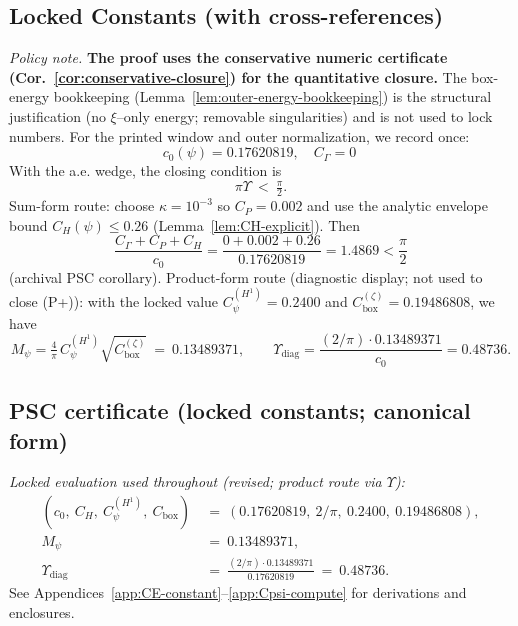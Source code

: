 \documentclass[11pt]{article}
\providecommand{\czeroplateau}{0.17620819}%
\providecommand{\CboxZeta}{K_0 + K_\xi}%
\providecommand{\CpsiHone}{0.2400}%
\providecommand{\Mpsilocked}{(4/\pi)\,\CpsiHone\,\sqrt{\CboxZeta}}
\providecommand{\UpsilonLocked}{(2/\pi)\,\Mpsilocked/\czeroplateau}%
\renewcommand{\CboxZeta}{0.19486808}
\renewcommand{\Mpsilocked}{0.13489371}
\renewcommand{\UpsilonLocked}{0.48736}
\theoremstyle{definition}
\theoremstyle{remark}
\begin{document}
\subsection*{Locked Constants (with cross-references)}
\noindent\emph{Policy note.} \textbf{The proof uses the conservative numeric certificate (Cor.~\ref{cor:conservative-closure}) for the quantitative closure.} The box-energy bookkeeping (Lemma~\ref{lem:outer-energy-bookkeeping}) is the structural justification (no $\xi$--only energy; removable singularities) and is not used to lock numbers.
\noindent For the printed window and outer normalization, we record once:
\[
 c_0(\psi)=0.17620819,\quad C_\Gamma=0\ 
\]
With the a.e. wedge, the closing condition is
\[ \pi\Upsilon\ <\ \tfrac{\pi}{2}. \]
Sum-form route: choose \(\kappa=10^{-3}\) so \(C_P=0.002\) and use the analytic envelope bound \(C_H(\psi)\le 0.26\) (Lemma~\ref{lem:CH-explicit}). Then
\[ \frac{C_\Gamma+C_P+C_H}{c_0}=\frac{0+0.002+0.26}{0.17620819}=1.4869<\frac{\pi}{2} \] (archival PSC corollary).
Product-form route (diagnostic display; not used to close (P+)): with the locked value \(C_\psi^{(H^1)}=0.2400\) and \(C_{\mathrm{box}}^{(\zeta)}=\CboxZeta\), we have
\[ M_\psi= \tfrac{4}{\pi}\,C_\psi^{(H^1)}\sqrt{C_{\mathrm{box}}^{(\zeta)}}\ =\ \Mpsilocked,\qquad \Upsilon_{\mathrm{diag}}=\frac{(2/\pi)\cdot \Mpsilocked}{c_0}=\UpsilonLocked.\]






\vspace{1.0cm}
\subsection*{PSC certificate (locked constants; canonical form)}
\noindent\textit{Locked evaluation used throughout (revised; product route via $\Upsilon$):}
\begin{align*}
 (c_0,\ C_H,\ C_\psi^{(H^1)},\ C_{\mathrm{box}})
 &\ =\ (0.17620819,\ 2/\pi,\ 0.2400,\ \CboxZeta),\\
 M_\psi\ &\ =\ \Mpsilocked,\\
 \Upsilon_{\mathrm{diag}}\ &\ =\ \frac{(2/\pi)\cdot \Mpsilocked}{0.17620819}\ =\ \UpsilonLocked. 
\end{align*}
See Appendices~\ref{app:CE-constant}--\ref{app:Cpsi-compute} for derivations and enclosures.





\vspace{1.0cm}
\end{document}
